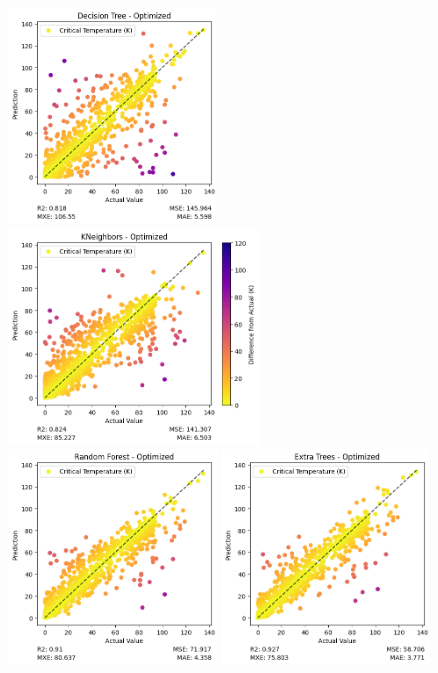\documentclass[twocolumn, nofootinbib, secnumarabic, amssymb, nobibnotes, aps, prd]{revtex4-2}
\begin{document}
\begin{figure}[t]
   \includegraphics[height=2.25in]{images/subfigures/no_uncertainty/decision_tree_optimized.png}
   \includegraphics[height=2.25in]{images/subfigures/no_uncertainty/kneighbors_optimized.png}
   \includegraphics[height=2.25in]{images/subfigures/no_uncertainty/random_forest_optimized.png}
   \includegraphics[height=2.25in]{images/subfigures/no_uncertainty/extra_trees_optimized.png}

\end{figure}
\end{document}
